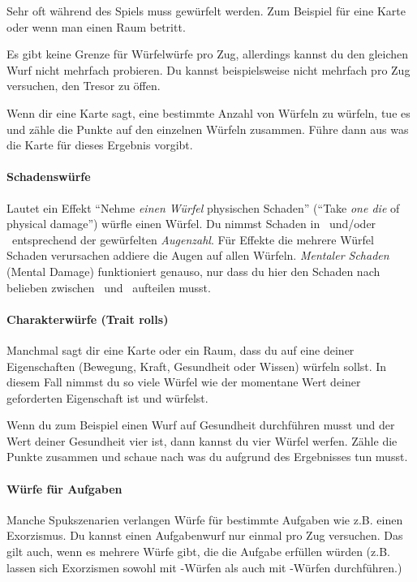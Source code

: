 Sehr oft während des Spiels muss gewürfelt werden. Zum Beispiel für eine Karte oder wenn man einen Raum betritt.

Es gibt keine Grenze für Würfelwürfe pro Zug, allerdings kannst du den gleichen Wurf nicht mehrfach probieren. Du kannst beispielsweise nicht mehrfach pro Zug versuchen, den Tresor zu öffen.

Wenn dir eine Karte sagt, eine bestimmte Anzahl von Würfeln zu würfeln, tue es und zähle die Punkte auf den einzelnen Würfeln zusammen. Führe dann aus was die Karte für dieses Ergebnis vorgibt.

\paragraph{Schadenswürfe} Lautet ein Effekt ``Nehme \emph{einen Würfel} physischen Schaden'' (``Take \emph{one die} of physical damage'') würfle einen Würfel. Du nimmst Schaden in \might\ und/oder \speed\ entsprechend der gewürfelten \emph{Augenzahl}. Für Effekte die mehrere Würfel Schaden verursachen addiere die Augen auf allen Würfeln. \emph{Mentaler Schaden} (Mental Damage) funktioniert genauso, nur dass du hier den Schaden nach belieben zwischen \sanity\ und \know\ aufteilen musst.

\paragraph{Charakterwürfe (Trait rolls)} Manchmal sagt dir eine Karte oder ein Raum, dass du auf eine deiner Eigenschaften (Bewegung, Kraft, Gesundheit oder Wissen) würfeln sollst. In diesem Fall nimmst du so viele Würfel wie der momentane Wert deiner geforderten Eigenschaft ist und würfelst.

Wenn du zum Beispiel einen Wurf auf Gesundheit durchführen musst und der Wert deiner Gesundheit vier ist, dann kannst du vier Würfel werfen. Zähle die Punkte zusammen und schaue nach was du aufgrund des Ergebnisses tun musst.

\paragraph{Würfe für Aufgaben} Manche Spukszenarien verlangen Würfe für bestimmte Aufgaben wie z.B. einen Exorzismus. Du kannst einen Aufgabenwurf nur einmal pro Zug versuchen. Das gilt auch, wenn es mehrere Würfe gibt, die die Aufgabe erfüllen würden (z.B. lassen sich Exorzismen sowohl mit \sanity-Würfen als auch mit \know-Würfen durchführen.)

